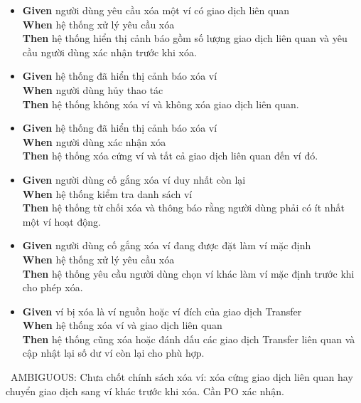 \begin{itemize}
\item \textbf{Given} người dùng yêu cầu xóa một ví có giao dịch liên quan  \\ \hspace*{1.5em}  \textbf{When} hệ thống xử lý yêu cầu xóa  \\ \hspace*{1.5em}  \textbf{Then} hệ thống hiển thị cảnh báo gồm số lượng giao dịch liên quan và yêu cầu người dùng xác nhận trước khi xóa.
\item \textbf{Given} hệ thống đã hiển thị cảnh báo xóa ví  \\ \hspace*{1.5em}  \textbf{When} người dùng hủy thao tác  \\ \hspace*{1.5em}  \textbf{Then} hệ thống không xóa ví và không xóa giao dịch liên quan.
\item \textbf{Given} hệ thống đã hiển thị cảnh báo xóa ví  \\ \hspace*{1.5em}  \textbf{When} người dùng xác nhận xóa  \\ \hspace*{1.5em}  \textbf{Then} hệ thống xóa cứng ví và tất cả giao dịch liên quan đến ví đó.
\item \textbf{Given} người dùng cố gắng xóa ví duy nhất còn lại  \\ \hspace*{1.5em}  \textbf{When} hệ thống kiểm tra danh sách ví  \\ \hspace*{1.5em}  \textbf{Then} hệ thống từ chối xóa và thông báo rằng người dùng phải có ít nhất một ví hoạt động.
\item \textbf{Given} người dùng cố gắng xóa ví đang được đặt làm ví mặc định  \\ \hspace*{1.5em}  \textbf{When} hệ thống xử lý yêu cầu xóa  \\ \hspace*{1.5em}  \textbf{Then} hệ thống yêu cầu người dùng chọn ví khác làm ví mặc định trước khi cho phép xóa.
\item \textbf{Given} ví bị xóa là ví nguồn hoặc ví đích của giao dịch Transfer  \\ \hspace*{1.5em}  \textbf{When} hệ thống xóa ví và giao dịch liên quan  \\ \hspace*{1.5em}  \textbf{Then} hệ thống cũng xóa hoặc đánh dấu các giao dịch Transfer liên quan và cập nhật lại số dư ví còn lại cho phù hợp.
\end{itemize}
\warningicon\  AMBIGUOUS: Chưa chốt chính sách xóa ví: xóa cứng giao dịch liên quan hay chuyển giao dịch sang ví khác trước khi xóa. Cần PO xác nhận.



